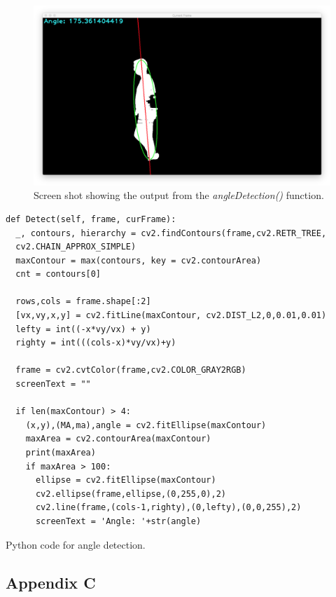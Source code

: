 \documentclass[11pt,a4paper]{report}
\begin{document}
\begin{figure}[H]
 \centering
 \includegraphics[scale = 0.22]{angleExample.png}
 \caption[Angle Detection]{Screen shot showing the output from the \textit{angleDetection()} function.}
 \label{fig:angleDetectionExample}
\end{figure}

\begin{listing}
\begin{verbatim}
def Detect(self, frame, curFrame):
  _, contours, hierarchy = cv2.findContours(frame,cv2.RETR_TREE,
  cv2.CHAIN_APPROX_SIMPLE)
  maxContour = max(contours, key = cv2.contourArea)
  cnt = contours[0]

  rows,cols = frame.shape[:2]
  [vx,vy,x,y] = cv2.fitLine(maxContour, cv2.DIST_L2,0,0.01,0.01)
  lefty = int((-x*vy/vx) + y)
  righty = int(((cols-x)*vy/vx)+y)

  frame = cv2.cvtColor(frame,cv2.COLOR_GRAY2RGB)
  screenText = ""

  if len(maxContour) > 4:
    (x,y),(MA,ma),angle = cv2.fitEllipse(maxContour)
    maxArea = cv2.contourArea(maxContour)
    print(maxArea)
    if maxArea > 100:
      ellipse = cv2.fitEllipse(maxContour)
      cv2.ellipse(frame,ellipse,(0,255,0),2)
      cv2.line(frame,(cols-1,righty),(0,lefty),(0,0,255),2)
      screenText = 'Angle: '+str(angle)
\end{verbatim}
\caption{Python code for angle detection.}
\label{angleDetectionPython}
\end{listing}

\subsection{Appendix C}
\end{document}
